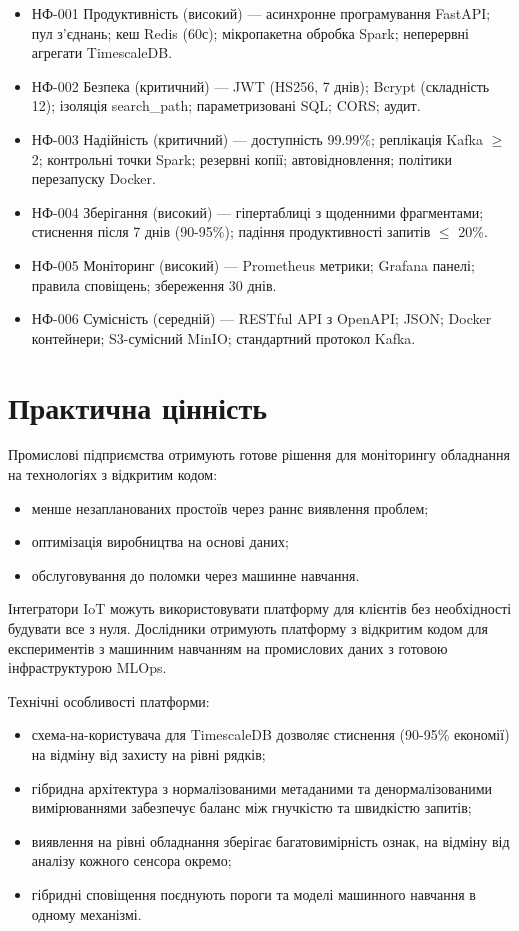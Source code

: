 \begin{itemize}
    \item НФ-001 Продуктивність (високий) --- асинхронне програмування FastAPI; пул з'єднань; кеш Redis (60с); мікропакетна обробка Spark; неперервні агрегати TimescaleDB.
    \item НФ-002 Безпека (критичний) --- JWT (HS256, 7 днів); Bcrypt (складність 12); ізоляція search\_path; параметризовані SQL; CORS; аудит.
    \item НФ-003 Надійність (критичний) --- доступність 99.99\%; реплікація Kafka $\geq$ 2; контрольні точки Spark; резервні копії; автовідновлення; політики перезапуску Docker.
    \item НФ-004 Зберігання (високий) --- гіпертаблиці з щоденними фрагментами; стиснення після 7 днів (90-95\%); падіння продуктивності запитів $\leq$ 20\%.
    \item НФ-005 Моніторинг (високий) --- Prometheus метрики; Grafana панелі; правила сповіщень; збереження 30 днів.
    \item НФ-006 Сумісність (середній) --- RESTful API з OpenAPI; JSON; Docker контейнери; S3-сумісний MinIO; стандартний протокол Kafka.
\end{itemize}


\section{Практична цінність}

Промислові підприємства отримують готове рішення для моніторингу обладнання на технологіях з відкритим кодом:

\begin{itemize}
    \item менше незапланованих простоїв через раннє виявлення проблем;
    \item оптимізація виробництва на основі даних;
    \item обслуговування до поломки через машинне навчання.
\end{itemize}

Інтегратори IoT можуть використовувати платформу для клієнтів без необхідності будувати все з нуля. Дослідники отримують платформу з відкритим кодом для експериментів з машинним навчанням на промислових даних з готовою інфраструктурою MLOps.

Технічні особливості платформи:

\begin{itemize}
    \item схема-на-користувача для TimescaleDB дозволяє стиснення (90-95\% економії) на відміну від захисту на рівні рядків;
    \item гібридна архітектура з нормалізованими метаданими та денормалізованими вимірюваннями забезпечує баланс між гнучкістю та швидкістю запитів;
    \item виявлення на рівні обладнання зберігає багатовимірність ознак, на відміну від аналізу кожного сенсора окремо;
    \item гібридні сповіщення поєднують пороги та моделі машинного навчання в одному механізмі.
\end{itemize}


